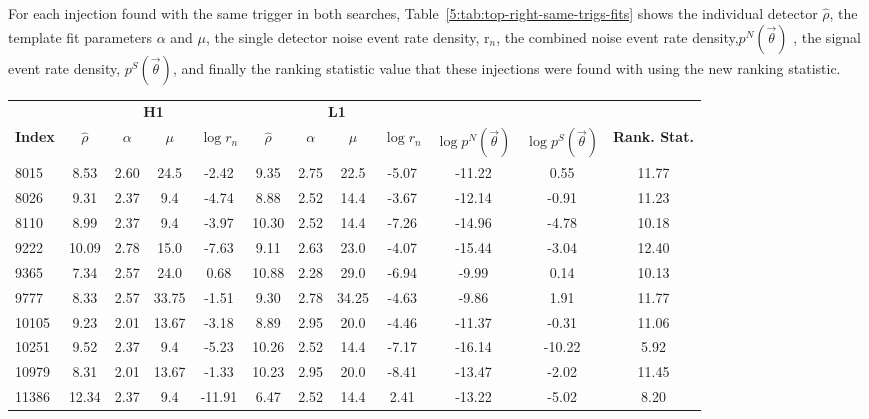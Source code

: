 For each injection found with the same trigger in both searches, Table~\ref{5:tab:top-right-same-trigs-fits} shows the individual detector $\hat{\rho}$, the template fit parameters $\alpha$ and $\mu$, the single detector noise event rate density, r$_n$, the combined noise event rate density,$p^{N}(\Vec{\theta})$ , the signal event rate density, $p^{S}(\Vec{\theta})$, and finally the ranking statistic value that these injections were found with using the new ranking statistic.
%
\begin{table}[ht]
    \centering
    \small
    \setlength{\tabcolsep}{4pt}
    \begin{tabular}{lccccccccccc}
        \toprule
        & \multicolumn{4}{c}{\textbf{H1}} & \multicolumn{4}{c}{\textbf{L1}} \\
        \cmidrule(lr){2-5} \cmidrule(lr){6-9}
        \textbf{Index} & \textbf{$\hat{\rho}$} & \textbf{$\alpha$} & \textbf{$\mu$} & \textbf{$\log r_n$} & \textbf{$\hat{\rho}$} & \textbf{$\alpha$} & \textbf{$\mu$} & \textbf{$\log r_n$} & \textbf{$\log p^{N}(\Vec{\theta})$} & \textbf{$\log p^{S}(\Vec{\theta})$} & \textbf{Rank. Stat.} \\
        \midrule
        8015 & 8.53 & 2.60 & 24.5 & -2.42 & 9.35 & 2.75 & 22.5 & -5.07 & -11.22 & 0.55 & 11.77 \\
        8026 & 9.31 & 2.37 & 9.4 & -4.74 & 8.88 & 2.52 & 14.4 & -3.67 & -12.14 & -0.91 & 11.23 \\
        8110 & 8.99 & 2.37 & 9.4 & -3.97 & 10.30 & 2.52 & 14.4 & -7.26 & -14.96 & -4.78 & 10.18 \\
        9222 & 10.09 & 2.78 & 15.0 & -7.63 & 9.11 & 2.63 & 23.0 & -4.07 & -15.44 & -3.04 & 12.40 \\
        9365 & 7.34 & 2.57 & 24.0 & 0.68 & 10.88 & 2.28 & 29.0 & -6.94 & -9.99 & 0.14 & 10.13 \\
        9777 & 8.33 & 2.57 & 33.75 & -1.51 & 9.30 & 2.78 & 34.25 & -4.63 & -9.86 & 1.91 & 11.77 \\
        10105 & 9.23 & 2.01 & 13.67 & -3.18 & 8.89 & 2.95 & 20.0 & -4.46 & -11.37 & -0.31 & 11.06 \\
        10251 & 9.52 & 2.37 & 9.4 & -5.23 & 10.26 & 2.52 & 14.4 & -7.17 & -16.14 & -10.22 & 5.92 \\
        10979 & 8.31 & 2.01 & 13.67 & -1.33 & 10.23 & 2.95 & 20.0 & -8.41 & -13.47 & -2.02 & 11.45 \\
        11386 & 12.34 & 2.37 & 9.4 & -11.91 & 6.47 & 2.52 & 14.4 & 2.41 & -13.22 & -5.02 & 8.20 \\

\end{tabular}
\end{table}
